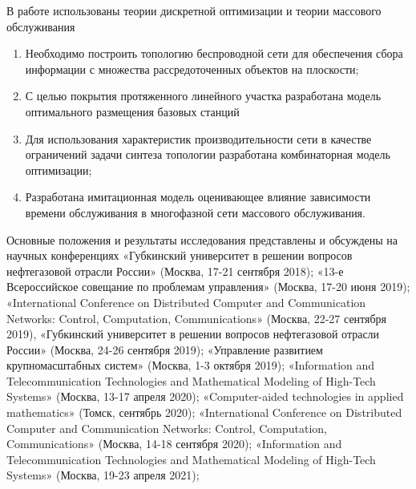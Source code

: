 {\methods} В работе использованы теории дискретной оптимизации и теории массового обслуживания

{}
\begin{enumerate}[beginpenalty=10000] %
  \item Необходимо построить топологию беспроводной сети для обеспечения сбора информации с множества рассредоточенных объектов на плоскости;
  \item С целью покрытия протяженного линейного участка разработана модель оптимального размещения базовых станций
  \item Для использования характеристик производительности сети в качестве ограничений задачи синтеза топологии разработана комбинаторная модель оптимизации;
  \item Разработана имитационная модель оценивающее влияние зависимости времени обслуживания в многофазной сети массового обслуживания.
\end{enumerate}




{\probation}
Основные положения и результаты исследования представлены и обсуждены на научных конференциях «Губкинский университет в решении вопросов нефтегазовой отрасли России» (Москва, 17-21 сентября 2018); «13-е Всероссийское совещание по проблемам управления» (Москва, 17-20 июня 2019); «International Conference on Distributed Computer and Communication Networks: Control, Computation, Communications» (Москва, 22-27 сентября 2019), «Губкинский университет в решении вопросов нефтегазовой отрасли России» (Москва, 24-26 сентября 2019); «Управление развитием крупномасштабных систем» (Москва, 1-3 октября 2019); «Information and Telecommunication Technologies and Mathematical Modeling of High-Tech Systems» (Москва, 13-17 апреля 2020); «Computer-aided technologies in applied mathematics» (Томск, сентябрь 2020); «International Conference on Distributed Computer and Communication Networks: Control, Computation, Communications» (Москва, 14-18 сентября 2020); «Information and Telecommunication Technologies and Mathematical Modeling of High-Tech Systems» (Москва, 19-23 апреля 2021);


